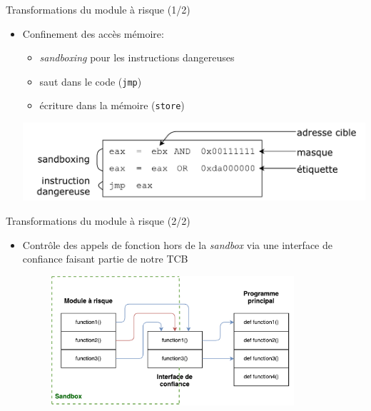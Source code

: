\documentclass[10pt,usenames,dvipsnames]{beamer}
\begin{document}
\begin{frame}{Transformations du module à risque (1/2)}
	\begin{itemize}
		\item Confinement des accès mémoire: 
		\begin{itemize}
			\item \textit{sandboxing} pour les instructions dangereuses
			\item saut dans le code (\texttt{jmp})
			\item écriture dans la mémoire (\texttt{store})
		\end{itemize}		 
			\includegraphics[scale=0.5]{algo_sandboxing.pdf}
	\end{itemize}
\end{frame}

\begin{frame}{Transformations du module à risque (2/2)}
	\begin{itemize}
		\item Contrôle des appels de fonction hors de la \textit{sandbox} via une interface de confiance faisant partie de notre TCB		
		\vspace{5mm}
		\begin{figure}
			\centering
			\includegraphics[width=0.85\textwidth]{interface.pdf}		
		\end{figure}
	\end{itemize}
\end{frame}

\end{document}
